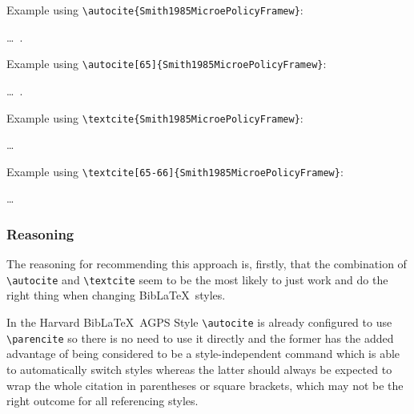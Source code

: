 \documentclass[a4paper, 11pt]{article}
\newcommand*{\BibLaTeX}{Bib\LaTeX}
\newcommand*{\printsubbibliographyEndRefSection}{
    \printbibliography[heading=subbibliography, title=Reference]
    \endrefsection
}
\newenvironment{agpsExample}{
    \setlength{\parindent}{0pt}
    \medskip
}
{}
\newenvironment{bareList}{%
    \begin{list}{}{}%
}
{\end{list}}
\begin{document}
\begin{agpsExample}

    Example using \verb|\autocite{Smith1985MicroePolicyFramew}|:

    \begin{bareList}
        \item \ldots\ \autocite{Smith1985MicroePolicyFramew}.
    \end{bareList}

    Example using \verb|\autocite[65]{Smith1985MicroePolicyFramew}|:

    \begin{bareList}
        \item \ldots\ \autocite[65]{Smith1985MicroePolicyFramew}.
    \end{bareList}

    Example using \verb|\textcite{Smith1985MicroePolicyFramew}|:

    \begin{bareList}
        \item \textcite{Smith1985MicroePolicyFramew} \ldots
    \end{bareList}

    Example using \verb|\textcite[65-66]{Smith1985MicroePolicyFramew}|:

    \begin{bareList}
        \item \textcite[65-66]{Smith1985MicroePolicyFramew} \ldots
    \end{bareList}

\end{agpsExample}

\printsubbibliographyEndRefSection

\subsubsection{Reasoning}

The reasoning for recommending this approach is, firstly, that the combination of \verb|\autocite|
and \verb|\textcite| seem to be the most likely to just work and do the right thing when changing
\BibLaTeX\ styles.

In the Harvard \BibLaTeX\ AGPS Style \verb|\autocite| is already configured to use \verb|\parencite|
so there is no need to use it directly and the former has the added advantage of being considered to
be a style-independent command which is able to automatically switch styles whereas the latter
should always be expected to wrap the whole citation in parentheses or square brackets, which may
not be the right outcome for all referencing styles.
\end{document}
